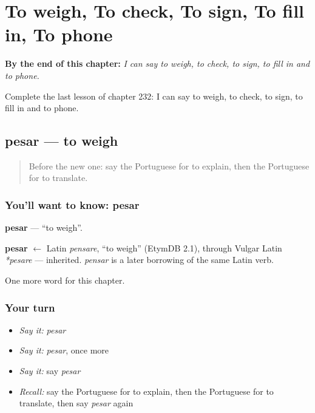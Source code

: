 
\chapter{To weigh, To check, To sign, To fill in, To phone}
\label{ch:pt-to-weigh-to-check-to-sign-to-fill-in-to-phone}

\begin{chapteropening}
\textbf{By the end of this chapter:} \emph{I can say to weigh, to check, to sign, to fill in and to phone.}

Complete the last lesson of chapter 232: I can say to weigh, to check, to sign, to fill in and to phone.
\end{chapteropening}

\section[pesar]{pesar — to weigh}

\label{lesson:PT-C232-pesar}



\begin{quote}
Before the new one: say the Portuguese for to explain, then the Portuguese for to translate.
\end{quote}

\subsection*{You'll want to know: pesar}
\textbf{pesar} — \textquotedblleft{}to weigh\textquotedblright{}.

\begin{cousinweb}
\textbf{pesar} $\leftarrow$ Latin \emph{pensare}, \textquotedblleft{}to weigh\textquotedblright{} (EtymDB 2.1), through Vulgar Latin \emph{*pesare} — inherited. \emph{pensar} is a later borrowing of the same Latin verb.
\end{cousinweb}

\begin{grammarlens}[title={What you've built}]
One more word for this chapter.
\end{grammarlens}

\subsection*{Your turn}
\begin{itemize}
\raggedright
  \item \emph{Say it:} \emph{pesar}
  \item \emph{Say it:} \emph{pesar}, once more
  \item \emph{Say it:} say \emph{pesar}
  \item \emph{Recall:} say the Portuguese for to explain, then the Portuguese for to translate, then say \emph{pesar} again
\end{itemize}

